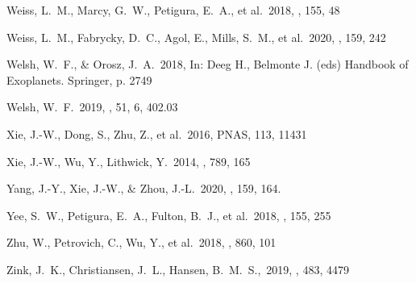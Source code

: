 \documentclass{aastex62}
\def\pnas{PNAS}
\begin{document}
\begin{thebibliography}{}
 Weiss, L.~M., Marcy, G.~W., Petigura, E.~A., et al.\ 2018, \aj, 155, 48 %


Weiss, L.~M.,  Fabrycky, D.~C., Agol, E.,  Mills, S.~M., et al.~2020,  \aj, 159, 242

 Welsh, W.~F., \& Orosz, J.~A.~2018, In: Deeg H., Belmonte J. (eds) Handbook of Exoplanets. Springer, p. 2749%

 Welsh, W.~F.~2019, \baas, 51, 6, 402.03

Xie, J.-W., Dong, S., Zhu, Z., et al.~2016, \pnas, 113, 11431

Xie, J.-W., Wu, Y., Lithwick, Y.~2014, \apj, 789, 165

 Yang, J.-Y., Xie, J.-W., \& Zhou, J.-L.\ 2020, \aj, 159, 164. %


Yee, S.~W.,  Petigura, E.~A.,  Fulton, B.~J., et al.~2018, \aj, 155, 255



 Zhu, W., Petrovich, C., Wu, Y., et al.\ 2018, \apj, 860, 101 %

 Zink, J.~K., Christiansen, J.~L., Hansen, B.~M.~S.,~2019, \mnras, 483, 4479



\end{thebibliography}
\end{document}
